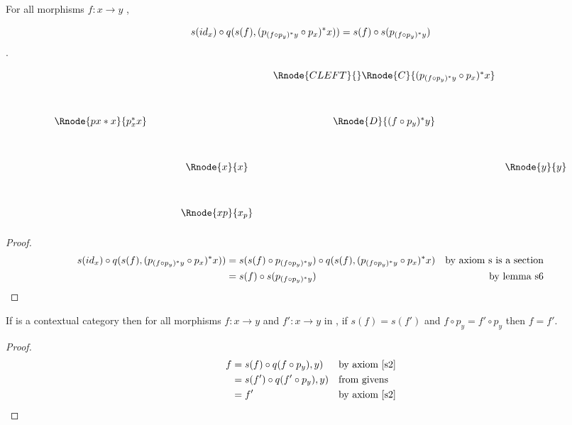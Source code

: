 \documentclass[10pt,a4paper]{scrartcl}
\begin{document}
\begin{lemma} [lemma 30v]
\label{30v}  
For all morphisms $f: x \rightarrow y$ ,

$$s(id_x) \circ q(s(f),(p_{(f \circ p_y) ^* y} \circ p_x) ^* x)) = s(f) \circ s( p_{(f \circ p_y) ^* y} )$$.
\begin{center}
\begin{displaymath}
\begin{array}{c p{.5cm} c p{.01cm} c c}
                   &&&& \Rnode{CLEFT}{}\Rnode{C}{(p_{(f \circ p_y) \sub y} \circ p_x) \sub x}  \\ [1.2cm]
\Rnode{px*x}{p_x \sub x} &&&& \Rnode{D}{(f \circ p_y) \sub y}  \\ [1.2cm]
           && \Rnode{x}{x} &&& \Rnode{y}{y} \\ [1.2cm]
					&& \Rnode{xp}{x_p} \\ [0.2cm]  
\end{array}
\end{displaymath}


\end{center}
\end{lemma}
\begin{proof}
\begin{align*}
s(id_x) \circ q(s(f),(p_{(f \circ p_y) ^* y} \circ p_x) ^* x))
    & = s(s(f) \circ p_{(f \circ p_y) ^* y}) \circ q(s(f), (p_{(f \circ p_y) ^* y} \circ p_x) ^* x) &\mbox{by axiom s is a section}\\
    & = s(f) \circ s( p_{(f \circ p_y) ^* y} )&\mbox{by lemma s6}\\
\end{align*}
\end{proof}

\begin{lemma} 
\label{s4}  
If  is a contextual category then for all morphisms $f: x \rightarrow y$ and $f':x \rightarrow y$ in ,
if $s(f)=s(f')$ and $f \circ p_y=f' \circ p_y$ then $f=f'$.
\end{lemma}
\begin{proof}
\begin{align*}
f 
    & = s(f)  \circ q(f \circ p_y),y)  &&\mbox{by axiom \ref{s2}}\\
    & = s(f') \circ q(f'\circ p_y),y)  &&\mbox{from givens}\\
		& = f'                             &&\mbox{by axiom \ref{s2}}
\end{align*}
\end{proof}
\end{document}
